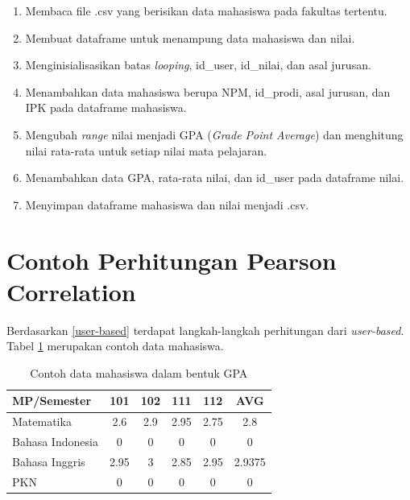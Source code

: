 \begin{enumerate}
    \item Membaca file .csv yang berisikan data mahasiswa pada fakultas tertentu.
    
    \item Membuat dataframe untuk menampung data mahasiswa dan nilai.
    
    \item Menginisialisasikan batas \textit{looping}, id\_user, id\_nilai, dan asal jurusan.
    
    \item Menambahkan data mahasiswa berupa NPM, id\_prodi, asal jurusan, dan IPK pada dataframe mahasiswa.
    
    \item Mengubah \textit{range} nilai menjadi GPA (\textit{Grade Point Average}) dan menghitung nilai rata-rata untuk setiap nilai mata pelajaran.
    
    \item Menambahkan data GPA, rata-rata nilai, dan id\_user pada dataframe nilai.
    
    \item Menyimpan dataframe mahasiswa dan nilai menjadi .csv.
\end{enumerate}

\section{Contoh Perhitungan Pearson Correlation}
Berdasarkan \ref{user-based} terdapat langkah-langkah perhitungan dari \textit{user-based}. Tabel \ref{tab:data mahasswa} merupakan contoh data mahasiswa.

\begin{table}[H]
    \centering
    \begin{tabular}{|l|c|c|c|c|c|}
        \hline
        MP\slash Semester & 101 & 102 & 111 & 112 & AVG \\
        \hline 
        Matematika & 2.6 & 2.9 & 2.95 & 2.75 & 2.8 \\
        \hline 
        Bahasa Indonesia & 0 & 0 & 0 & 0 & 0 \\
        \hline 
        Bahasa Inggris & 2.95 & 3 & 2.85 & 2.95 & 2.9375 \\
        \hline 
        PKN & 0 & 0 & 0 & 0 & 0 \\
        \hline
    \end{tabular}
    \caption{Contoh data mahasiswa dalam bentuk GPA}
	\label{tab:data mahasswa}
\end{table}

